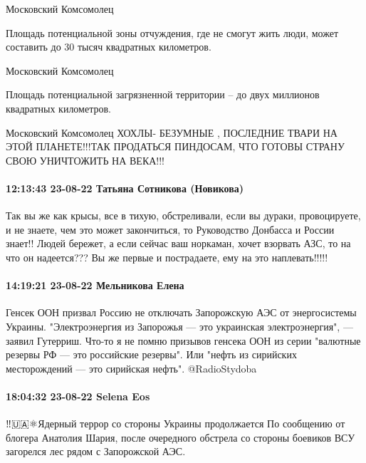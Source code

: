 Московский Комсомолец

Площадь потенциальной зоны отчуждения, где не смогут жить люди, может составить
до 30 тысяч квадратных километров.

Московский Комсомолец

Площадь потенциальной загрязненной территории – до двух миллионов квадратных
километров.

Московский Комсомолец ХОХЛЫ- БЕЗУМНЫЕ , ПОСЛЕДНИЕ ТВАРИ НА ЭТОЙ ПЛАНЕТЕ!!!ТАК
ПРОДАТЬСЯ ПИНДОСАМ, ЧТО ГОТОВЫ СТРАНУ СВОЮ УНИЧТОЖИТЬ НА ВЕКА!!!

\paragraph{12:13:43 23-08-22 Татьяна Сотникова (Новикова)}

Так вы же как крысы, все в тихую, обстреливали, если вы дураки, провоцируете, и
не знаете, чем это может закончиться, то Руководство Донбасса и России знает!!
Людей бережет, а если сейчас ваш норкаман, хочет взорвать АЗС, то на что он
надеется??? Вы же первые и пострадаете, ему на это наплевать!!!!!

\paragraph{14:19:21 23-08-22 Мельникова Елена}

Генсек ООН призвал Россию не отключать Запорожскую АЭС от энергосистемы
Украины.  "Электроэнергия из Запорожья — это украинская электроэнергия", —
заявил Гутерриш.  Что-то я не помню призывов генсека ООН из серии "валютные
резервы РФ — это российские резервы".  Или "нефть из сирийских месторождений —
это сирийская нефть".
@RadioStydoba

\paragraph{18:04:32 23-08-22 Selena Eos}

‼️🇺🇦⚛️Ядерный террор со стороны Украины продолжается
По сообщению от блогера Анатолия Шария, после очередного обстрела со стороны боевиков ВСУ загорелся лес рядом с Запорожской АЭС.
